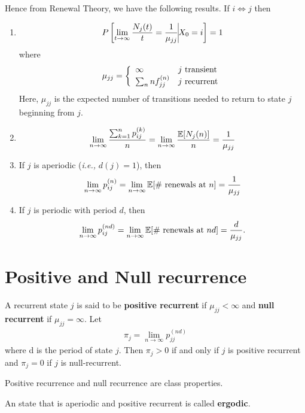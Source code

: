 \documentclass[a4paper,10pt,english]{article}
\begin{document}
Hence from Renewal Theory, we have the following results. If $i \iff j$ then
\begin{enumerate}
	\item 
	\begin{align*}P\left[ \lim_{t \to \infty} \frac{N_j(t)}{t}= \frac{1}{\mu_{jj}} \vline X_0 = i\right] = 1\end{align*}
	where
 \begin{align*}\mu_{jj} = \left\{\begin{array}{l l}
	\infty & j \mbox{ transient} \\
	\sum_n n f_{jj}^{(n)} & j \mbox{ recurrent}	
	\end{array}\right.\end{align*}
      Here, $\mu_{jj}$ is the expected number of transitions needed to
      return to state $j$ beginning from $j$.
    \item
      \begin{align*}\lim_{n \to \infty} \frac{\sum_{k=1}^n p_{ij}^{(k)}}{n} =
      \lim_{n \to \infty} \frac{\mathbb{E}[N_j(n)] }{n} =
      \frac{1}{\mu_{jj}}\end{align*}

	\item If $j$ is aperiodic (\textit{i.e.,} $d(j)=1$), then \begin{align*} \lim_{n \to \infty} p_{ij}^{(n)} = \lim_{n \to \infty} \mathbb{E}[\# \mbox{ renewals at $n$}]  = \frac{1}{\mu_{jj}}\end{align*}
	\item If $j$ is periodic with period $d$, then \begin{align*} \lim_{n \to \infty} p_{ij}^{(nd)}= \lim_{n \to \infty} \mathbb{E}[\# \mbox{ renewals at $nd$}] = \frac{d}{\mu_{jj}}.\end{align*}
\end{enumerate}

\section{Positive and Null recurrence}
A recurrent state $j$ is said to be \textbf{positive recurrent} if $\mu_{jj} < \infty$ and \textbf{null recurrent} if $\mu_{jj} = \infty$. Let
\begin{align*}\pi_j = \lim_{n \to \infty} p_{jj}^{(nd)}\end{align*}
where d is the period of state $j$. Then $\pi_j > 0$ if and only if $j$ is positive recurrent and $\pi_j = 0$ if  $j$ is null-recurrent. 

\begin{prop}
Positive recurrence and null recurrence are class properties.
\end{prop}
\begin{defn}
An state that is aperiodic and positive recurrent is called \textbf{ergodic}.
\end{defn}
\end{document}
